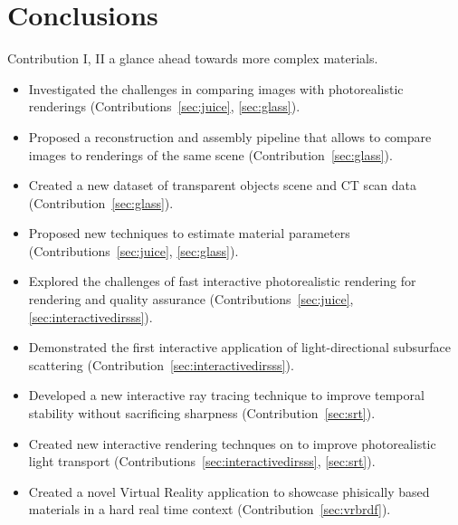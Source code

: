 \chapter{Conclusions}

Contribution I, II a glance ahead towards more complex materials.

\label{sec:conclusion}
\begin{itemize}
\item Investigated the challenges in comparing images with photorealistic renderings (Contributions~\ref{sec:juice}, \ref{sec:glass}).
\item Proposed a reconstruction and assembly pipeline that allows to compare images to renderings of the same scene (Contribution~\ref{sec:glass}).
\item Created a new dataset of transparent objects scene and CT scan data (Contribution~\ref{sec:glass}).
\item Proposed new techniques to estimate material parameters (Contributions~\ref{sec:juice}, \ref{sec:glass}).
\item Explored the challenges of fast interactive photorealistic rendering for rendering and quality assurance (Contributions~\ref{sec:juice},\ref{sec:interactivedirsss}).
\item Demonstrated the first interactive application of light-directional subsurface scattering (Contribution~\ref{sec:interactivedirsss}).
\item Developed a new interactive ray tracing technique to improve temporal stability without sacrificing sharpness (Contribution~\ref{sec:srt}).
\item Created new interactive rendering technques on to improve photorealistic light transport (Contributions~\ref{sec:interactivedirsss}, \ref{sec:srt}).
\item Created a novel Virtual Reality application to showcase phisically based materials in a hard real time context (Contribution~\ref{sec:vrbrdf}).
\end{itemize}